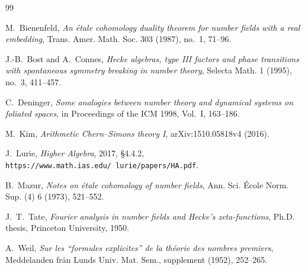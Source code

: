 \documentclass[11pt]{article}
\theoremstyle{plain}
\theoremstyle{definition}
\theoremstyle{remark}
\begin{document}
\begin{thebibliography}{99}

M.~Bienenfeld,
\emph{An \'etale cohomology duality theorem for number fields with a real
embedding}, Trans. Amer. Math. Soc. 303 (1987), no.~1, 71--96.

J.-B.~Bost and A.~Connes,
\emph{Hecke algebras, type III factors and phase transitions with
spontaneous symmetry breaking in number theory}, Selecta Math. 1 (1995),
no.~3, 411--457.

C.~Deninger,
\emph{Some analogies between number theory and dynamical systems on
foliated spaces}, in Proceedings of the ICM 1998, Vol.~I, 163--186.

M.~Kim,
\emph{Arithmetic Chern--Simons theory I}, arXiv:1510.05818v4 (2016).

J.~Lurie,
\emph{Higher Algebra}, 2017, \S4.4.2,
\texttt{https://www.math.ias.edu/{\string~}lurie/papers/HA.pdf}.

B.~Mazur,
\emph{Notes on \'etale cohomology of number fields}, Ann. Sci. \'Ecole
Norm. Sup. (4) 6 (1973), 521--552.

J.~T.~Tate,
\emph{Fourier analysis in number fields and Hecke's zeta-functions},
Ph.D. thesis, Princeton University, 1950.

A.~Weil,
\emph{Sur les ``formules explicites'' de la th\'eorie des nombres
premiers}, Meddelanden fr\aa n Lunds Univ. Mat. Sem., supplement (1952),
252--265.

\end{thebibliography}
\end{document}
